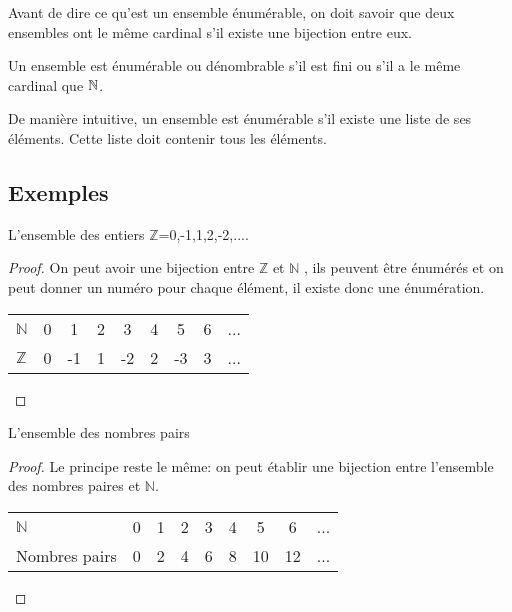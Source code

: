 Avant de dire ce qu'est un ensemble énumérable, on doit savoir que deux ensembles
ont le même cardinal s'il existe une bijection entre eux.

\begin{mydef}
	Un ensemble est énumérable ou dénombrable s'il est fini ou s'il a le même cardinal que $\mathbb{\mathbb{N}}$. \\
\end{mydef}

De manière intuitive, un ensemble est énumérable s'il existe une liste de ses éléments.  Cette liste doit contenir tous les éléments.

\subsection{Exemples}
\label{subsec:exemples}

\begin{myexem}
  L'ensemble des entiers $\mathbb{Z}$={0,-1,1,2,-2,...}.
  \begin{proof}
     On peut avoir une bijection entre $ \mathbb{Z}$ et $\mathbb{N}$ , ils peuvent être énumérés et on peut donner un numéro pour chaque élément, il existe donc une énumération. 
  
  \begin{tabular}{ l c c c c  c c c  r }
     $\mathbb{N}$ & 0 & 1 & 2  & 3 & 4 & 5 & 6 & ... \\
     $\mathbb{Z}$ & 0 & -1 & 1 & -2 & 2 & -3 & 3  & ... \\
    
    \end{tabular}
  \end{proof}
\end{myexem}
  
  
  
\begin{myexem}
 L'ensemble des nombres pairs
  \begin{proof}
  Le principe reste le même: on peut établir une bijection entre l'ensemble des nombres paires et $\mathbb{N}$.
 
   
   \begin{tabular}{ l c c c  c  c c c  r }
    $\mathbb{N}$ & 0 & 1 & 2  & 3 & 4 & 5 & 6 & ... \\
      Nombres pairs & 0 & 2 & 4 & 6 & 8 & 10 & 12  & ... \\
    
    \end{tabular}
  \end{proof} 
\end{myexem}
  
